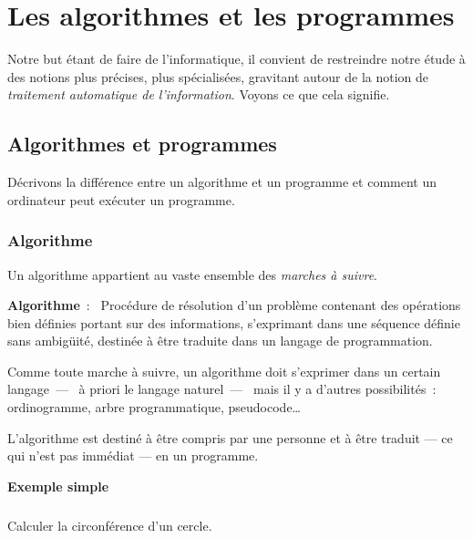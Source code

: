 \chapter{Les algorithmes et les programmes}
\label{algoprog}

	Notre but étant de faire de l’informatique, 
	il convient de restreindre notre étude 
	à des notions plus précises, plus spécialisées, 
	gravitant autour de la notion de 
	\textit{traitement automatique de l’information}.
	Voyons ce que cela signifie.

	\minitoc

	\section{Algorithmes et programmes}
	
		Décrivons la différence entre un algorithme et un programme
		et comment un ordinateur peut exécuter un programme.
	
		\subsection{Algorithme}
		
			Un algorithme appartient au vaste ensemble 
			des \textit{marches à suivre}.
	
			\textbf{Algorithme}~:~
			Procédure de résolution d’un problème 
			contenant des opérations bien définies 
			portant sur des informations, 
			s’exprimant dans une séquence définie sans ambigüité, 
			destinée à être traduite dans un langage de programmation.
		
			Comme toute marche à suivre, un algorithme doit s’exprimer dans un
			certain langage~—~ à priori le langage naturel~—~ mais il
			y a d’autres possibilités~:~ ordinogramme, arbre programmatique,
			pseudocode…

			L'algorithme est destiné à être compris par une personne et à être
			traduit — ce qui n'est pas immédiat — en un programme. 

			\textbf{Exemple simple}

			\begin{Emphase}
				\paragraph{} Calculer la circonférence d'un cercle.
			\end{Emphase}

